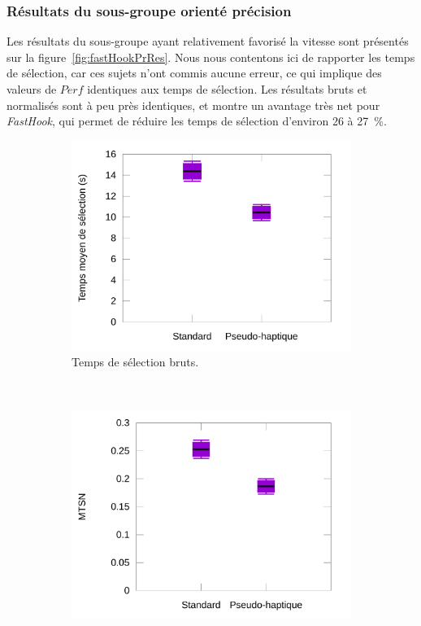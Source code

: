 	\subsubsection{Résultats du sous-groupe orienté précision}
	Les résultats du sous-groupe ayant relativement favorisé la vitesse sont présentés sur la figure~\ref{fig:fastHookPrRes}. Nous nous contentons ici de rapporter les temps de sélection, car ces sujets n'ont commis aucune erreur, ce qui implique des valeurs de $Perf$ identiques aux temps de sélection. Les résultats bruts et normalisés sont à peu près identiques, et montre un avantage très net pour \emph{FastHook}, qui permet de réduire les temps de sélection d'environ 26 à 27~\%{}.
	
	\begin{figure}[!htb]
		\begin{subfigure}[t]{0.49\textwidth}
			\centering
			\includegraphics[width=\textwidth]{figures/ch5/phPrRawTimes}
			\caption{Temps de sélection bruts.}
			\label{fig:phPrRawTimes}
		\end{subfigure}
		~
		\begin{subfigure}[t]{0.49\textwidth}
			\centering
			\includegraphics[width=\textwidth]{figures/ch5/phPrNormTimes}

\end{subfigure}
\end{figure}
